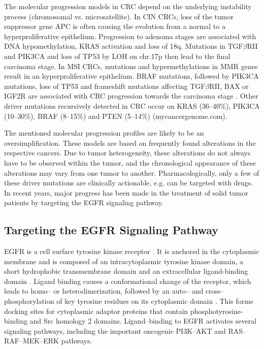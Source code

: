 {{{    The molecular progression models in CRC depend on the underlying instability
    process (chromosomal vs. microsatellite). In CIN CRCs, loss of the tumor
    suppressor gene APC is often causing the evolution from a normal to a
    hyperproliferative epithelium. Progression to adenoma stages are associated
    with DNA hypomethylation, KRAS activation and loss of 18q. Mutations in
    TGF$\beta$RII and PIK3CA and loss of TP53 by LOH on chr.17p then lead to the
    final carcinoma stage. In MSI CRCs, mutations and hypermethylations in MMR
    genes result in an hyperproliferative epithelium. BRAF mutations, followed
    by PIK3CA mutations, loss of TP53 and frameshift mutations affecting
    TGF$\beta$RII, BAX or IGF2R are associated with CRC progression towards the
    carcinoma stage {\cite{cin_crc}} {\cite{crc}} {\cite{crc_2}}. Other driver
    mutations recursively detected in CRC occur on KRAS (36--40\%), PIK3CA
    (10--30\%), BRAF (8--15\%) and PTEN (5--14\%) (mycancergenome.com).

    The mentioned molecular progression profiles are likely to be an
    oversimplification. These models are based on frequently found alterations
    in the respective cancers. Due to tumor heterogeneity, these alterations
    do not always have to be observed within the tumor, and the chronological
    appearance of these alterations may vary from one tumor to another.
    Pharmacologically, only a few of these driver mutations are clinically
    actionable, e.g. can be targeted with drugs. In recent years, major progress
    has been made in the treatment of solid tumor patients by targeting the
    EGFR signaling pathway.

  \subsection{Targeting the EGFR Signaling Pathway}

    EGFR is a cell surface tyrosine kinase receptor {\cite{egfr_review}}. It
    is anchored in the cytoplasmic membrane and is composed of an
    intracytoplasmic tyrosine kinase domain, a short hydrophobic transmembrane
    domain and an extracellular ligand-binding domain {\cite{egfr_review_2}}.
    Ligand binding causes a conformational change of the receptor, which leads
    to homo-- or heterodimerization, followed by an auto-- and
    cross--phosphorylation of key tyrosine residues on its cytoplasmic domain
    {\cite{egfr_review_2}}. This forms docking sites for cytoplasmic adaptor
    proteins that contain phosphotyrosine-binding and Src homology 2 domains.
    Ligand--binding to EGFR activates several signaling pathways, including the
    important oncogenic PI3K--AKT and RAS--RAF--MEK--ERK pathways.

}}}

